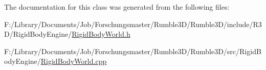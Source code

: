 The documentation for this class was generated from the following files\+:\begin{DoxyCompactItemize}
\item 
F\+:/\+Library/\+Documents/\+Job/\+Forschungsmaster/\+Rumble3\+D/\+Rumble3\+D/include/\+R3\+D/\+Rigid\+Body\+Engine/\hyperlink{_rigid_body_world_8h}{Rigid\+Body\+World.\+h}\item 
F\+:/\+Library/\+Documents/\+Job/\+Forschungsmaster/\+Rumble3\+D/\+Rumble3\+D/src/\+Rigid\+Body\+Engine/\hyperlink{_rigid_body_world_8cpp}{Rigid\+Body\+World.\+cpp}\end{DoxyCompactItemize}
